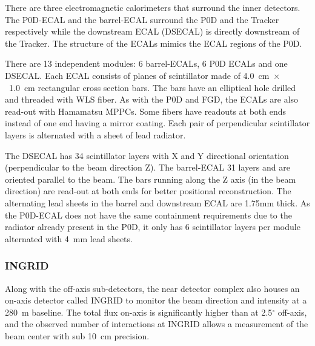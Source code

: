 There are three electromagnetic calorimeters that surround the inner
detectors. The P0D-ECAL and the barrel-ECAL surround the P0D and the
Tracker respectively while the downstream ECAL (DSECAL) is directly
downstream of the Tracker. The structure of the ECALs mimics the ECAL
regions of the P0D. 

There are 13 independent modules: 6 barrel-ECALs, 6 P0D ECALs and one
DSECAL. Each ECAL consists of planes of scintillator made of
4.0~cm~$\times$~1.0~cm rectangular cross section bars. The bars have an
elliptical hole drilled and threaded with WLS fiber. As with the P0D
and FGD, the ECALs are also read-out with Hamamatsu MPPCs. Some fibers
have readouts at both ends instead of one end having a mirror
coating. Each pair of perpendicular scintillator layers is alternated
with a sheet of lead radiator. 

The DSECAL has 34 scintillator layers with X and Y directional
orientation (perpendicular to the beam direction Z). The barrel-ECAL
31 layers and are oriented parallel to the beam. The bars running
along the Z axis (in the beam direction) are read-out at both ends for
better positional reconstruction. The alternating lead
sheets in the barrel and downstream ECAL are 1.75mm thick. As the P0D-ECAL does
not have the same containment requirements due to the radiator already
present in the P0D, it only has 6 scintillator layers per module
alternated with 4~mm lead sheets. 

\subsubsection{INGRID}

Along with the off-axis sub-detectors, the near detector complex also
houses an on-axis detector called INGRID to monitor the beam direction
and intensity at a 280~m baseline. The total flux on-axis is
significantly higher than at 2.5$^{\circ}$ off-axis, and the observed
number of interactions at INGRID allows a measurement of the beam
center with sub 10~cm precision. 

